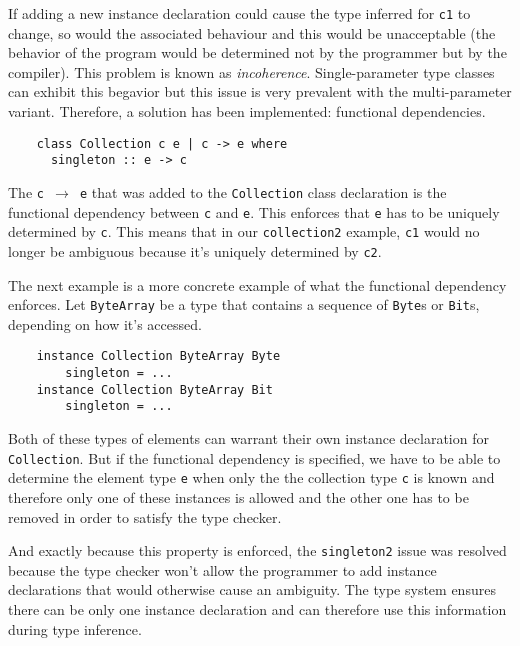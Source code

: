 If adding a new instance declaration could cause the type inferred for
\texttt{c1} to change, so would the associated behaviour and this would be
unacceptable (the behavior of the program would be determined not by the programmer but by the compiler). This problem is known as {\em incoherence}.
Single-parameter type classes can exhibit this begavior
but this issue is very prevalent with the
multi-parameter variant. Therefore, a solution has been implemented: functional
dependencies.
\begin{verbatim}
    class Collection c e | c -> e where
      singleton :: e -> c
\end{verbatim}
The \texttt{c $\rightarrow$ e} that was added to the \texttt{Collection} class
declaration is the functional dependency between \texttt{c} and \texttt{e}. This
enforces that \texttt{e} has to be uniquely determined by \texttt{c}.
This means that in our \texttt{collection2} example, \texttt{c1} would no longer
be ambiguous because it's uniquely determined by \texttt{c2}.

The next example is a more concrete example of what the functional dependency
enforces. Let \texttt{ByteArray} be a type that contains a sequence of
\texttt{Byte}s or \texttt{Bit}s, depending on how it's accessed.
\begin{verbatim}
    instance Collection ByteArray Byte
        singleton = ...
    instance Collection ByteArray Bit
        singleton = ...
\end{verbatim}
Both of these types of elements can warrant their own instance declaration for
\texttt{Collection}. But if the functional dependency is specified, we have to
be able to determine the element type \texttt{e} when only the the collection
type \texttt{c} is known and therefore only one of these instances is allowed
and the other one has to be removed in order to satisfy the type checker.

And exactly because this property is enforced, the \texttt{singleton2} issue was
resolved because the type checker won't allow the programmer to add instance
declarations that would otherwise cause an ambiguity. The type system ensures
there can be only one instance declaration and can therefore use this
information during type inference.

